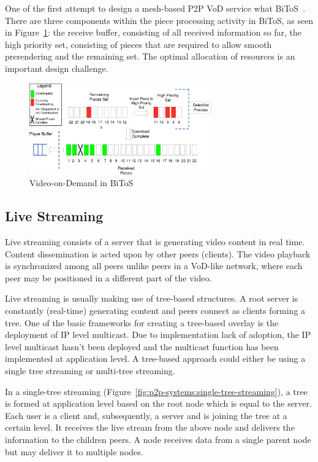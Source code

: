One of the first attempt to design a mesh-based P2P VoD service what
BiToS~\cite{bitos}. There are three components within the piece processing
activity in BiToS, as seen in Figure~\ref{fig:p2p-systems:bitos-vod}: the receive buffer, consisting of
all received information so far, the high priority set, consisting of pieces
that are required to allow smooth prerendering and the remaining set. The
optimal allocation of resources is an important design challenge.

\begin{figure}
  \centering
  \includegraphics[width=0.7\textwidth]{src/img/p2p-systems/bitos-vod}
  \caption{Video-on-Demand in BiToS}
  \label{fig:p2p-systems:bitos-vod}
\end{figure}

\subsection{Live Streaming}
\label{subsec:p2p-systems:ls}

Live streaming consists of a server that is generating video content in real
time. Content dissemination is acted upon by other peers (clients). The video
playback is synchronized among all peers unlike peers in a VoD-like network,
where each peer may be positioned in a different part of the video.

Live streaming is usually making use of tree-based structures. A root server
is constantly (real-time) generating content and peers connect as clients
forming a tree. One of the basic frameworks for creating a tree-based overlay
is the deployment of IP level multicast. Due to implementation lack of
adoption, the IP level multicast hasn't been deployed and the multicast
function has been implemented at application level. A tree-based approach
could either be using a single tree streaming or multi-tree streaming.

In a single-tree streaming (Figure~\ref{fig:p2p-systems:single-tree-streaming}), a tree is
formed at application level based on the
root node which is equal to the server. Each user is a client and,
subsequently, a server and is joining the tree at a certain level. It receives
the live stream from the above node and delivers the information to the
children peers. A node receives data from a single parent node but may deliver
it to multiple nodes.


